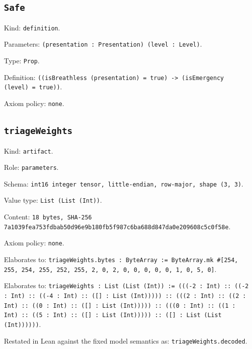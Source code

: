 \documentclass[11pt]{article}
\begin{document}
\subsection*{\texttt{Safe}}
\noindent Kind: \texttt{definition}.\par
\noindent Parameters: \texttt{(presentation : Presentation) (level : Level)}.\par
\noindent Type: \texttt{Prop}.\par
\noindent Definition: \texttt{((isBreathless (presentation) = true) -> (isEmergency (level) = true))}.\par
\noindent Axiom policy: \texttt{none}.\par
\subsection*{\texttt{triageWeights}}
\noindent Kind: \texttt{artifact}.\par
\noindent Role: \texttt{parameters}.\par
\noindent Schema: \texttt{int16 integer tensor, little-endian, row-major, shape (3, 3)}.\par
\noindent Value type: \texttt{List (List (Int))}.\par
\noindent Content: \texttt{18 bytes, SHA-256 7a1039fea753fdbab50d96e9b180fb5f987c6ba688d847da0e209608c5c0f58e}.\par
\noindent Axiom policy: \texttt{none}.\par
\noindent Elaborates to: \texttt{triageWeights.bytes : ByteArray := ByteArray.mk \#[254, 255, 254, 255, 252, 255, 2, 0, 2, 0, 0, 0, 0, 0, 1, 0, 5, 0]}.\par
\noindent Elaborates to: \texttt{triageWeights : List (List (Int)) := (((-2 : Int) :: ((-2 : Int) :: ((-4 : Int) :: ([] : List (Int))))) :: (((2 : Int) :: ((2 : Int) :: ((0 : Int) :: ([] : List (Int))))) :: (((0 : Int) :: ((1 : Int) :: ((5 : Int) :: ([] : List (Int))))) :: ([] : List (List (Int))))))}.\par
\noindent Restated in Lean against the fixed model semantics as: \texttt{triageWeights.decoded}.\par
\end{document}
